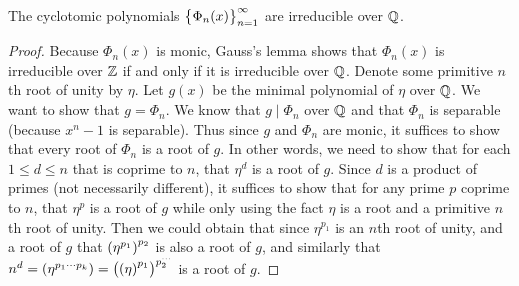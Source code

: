 \documentclass[11pt,a4paper]{article}
\begin{document}
\begin{theorem}
  \label{thm:cyclotomic-are-irreducible}
  The cyclotomic polynomials $\left\{\Phi_n(x)\right\}_{n=1}^{\infty}$
  are irreducible over $\mathbb{Q}$.
\end{theorem}
\begin{proof}
  Because $\Phi_n(x)$ is monic, Gauss's lemma shows that
  $\Phi_n(x)$ is irreducible over $\mathbb{Z}$ if and only if
  it is irreducible over $\mathbb{Q}$.
  Denote some primitive $n$th root of unity by $\eta$.
  Let $g(x)$ be the minimal polynomial of $\eta$ over $\mathbb{Q}$.
  We want to show that $g = \Phi_n$.
  We know that $g \mid \Phi_n$ over $\mathbb{Q}$
  and that $\Phi_n$ is separable (because $x^n - 1$ is separable).
  Thus since $g$ and $\Phi_n$ are monic,
  it suffices to show that every root of $\Phi_n$ is a root of $g$.
  In other words, we need to show that for each $1 \le d \le n$
  that is coprime to $n$, that $\eta^d$ is a root of $g$.
  Since $d$ is a product of primes (not necessarily different),
  it suffices to show that for any prime $p$ coprime to $n$,
  that $\eta^p$ is a root of $g$ while only using the fact $\eta$
  is a root and a primitive $n$th root of unity.
  Then we could obtain that since $\eta^{p_1}$
  is an $n$th root of unity, and a root of $g$ that $\del{\eta^{p_1}}^{p_{2}}$
  is also a root of $g$, and similarly that
  $n^d = (\eta^{p_1 \cdots p_k}) = \del{\del{\eta}^{p_1}}^{p_2^{\cdots}}$
  is a root of $g$.


\end{proof}
\end{document}
